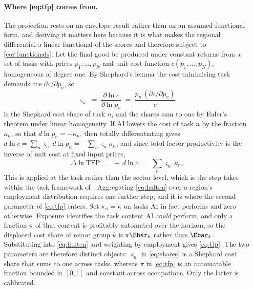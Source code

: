 \paragraph{Where \cref{eq:tfp} comes from.} The projection rests on an envelope result rather than on an assumed functional form, and deriving it matters here because it is what makes the regional differential a linear functional of the scores and therefore subject to \cref{cor:functionals}. Let the final good be produced under constant returns from a set of tasks with prices $p_1, \dots, p_N$ and unit cost function $c(p_1, \dots, p_N)$, homogeneous of degree one. By Shephard's lemma the cost-minimising task demands are $\partial c / \partial p_n$, so
\begin{equation}\label{eq:shares}
\varsigma_n \;=\; \frac{\partial \ln c}{\partial \ln p_n}
\;=\; \frac{p_n \, (\partial c / \partial p_n)}{c}
\end{equation}
is the Shephard cost share of task $n$, and the shares sum to one by Euler's theorem under linear homogeneity. If AI lowers the cost of task $n$ by the fraction $\kappa_n$, so that $d \ln p_n = -\kappa_n$, then totally differentiating gives $d \ln c = \sum_n \varsigma_n \, d\ln p_n = - \sum_n \varsigma_n \kappa_n$, and since total factor productivity is the inverse of unit cost at fixed input prices,
\begin{equation}\label{eq:hulten}
\Delta \ln \mathrm{TFP} \;=\; -\, d \ln c \;=\; \sum_n \varsigma_n \, \kappa_n .
\end{equation}
This is \citet{hulten1978} applied at the task rather than the sector level, which is the step \citet{acemoglu2025} takes within the task framework of \citet{acemoglu2019}. Aggregating \cref{eq:hulten} over a region's employment distribution requires one further step, and it is where the second parameter of \cref{eq:tfp} enters. Set $\kappa_n = \kappa$ on tasks AI in fact performs and zero otherwise. Exposure identifies the task content AI \emph{could} perform, and only a fraction $\pi$ of that content is profitably automated over the horizon, so the displaced cost share of minor group $k$ is $\pi \Ebar_k$ rather than $\Ebar_k$. Substituting into \cref{eq:hulten} and weighting by employment gives \cref{eq:tfp}. The two parameters are therefore distinct objects: $\varsigma_n$ in \cref{eq:shares} is a Shephard cost share that sums to one across tasks, whereas $\pi$ in \cref{eq:tfp} is an automatable fraction bounded in $[0,1]$ and constant across occupations. Only the latter is calibrated.

